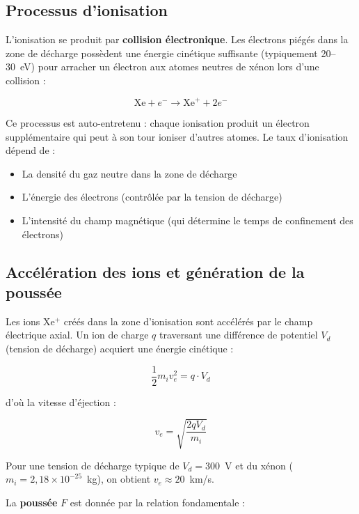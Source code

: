 \documentclass[12pt,a4paper]{article}
\begin{document}
\subsection{Processus d'ionisation}

L'ionisation se produit par \textbf{collision électronique}. Les électrons piégés dans la zone de décharge possèdent une énergie cinétique suffisante (typiquement 20--30~eV) pour arracher un électron aux atomes neutres de xénon lors d'une collision :

\begin{equation}
\text{Xe} + e^- \longrightarrow \text{Xe}^+ + 2e^-
\end{equation}

Ce processus est auto-entretenu : chaque ionisation produit un électron supplémentaire qui peut à son tour ioniser d'autres atomes. Le taux d'ionisation dépend de :
\begin{itemize}
    \item La densité du gaz neutre dans la zone de décharge
    \item L'énergie des électrons (contrôlée par la tension de décharge)
    \item L'intensité du champ magnétique (qui détermine le temps de confinement des électrons)
\end{itemize}

\subsection{Accélération des ions et génération de la poussée}

Les ions Xe$^+$ créés dans la zone d'ionisation sont accélérés par le champ électrique axial. Un ion de charge $q$ traversant une différence de potentiel $V_d$ (tension de décharge) acquiert une énergie cinétique :

\begin{equation}
\frac{1}{2} m_i v_e^2 = q \cdot V_d
\end{equation}

d'où la vitesse d'éjection :

\begin{equation}
v_e = \sqrt{\frac{2 q V_d}{m_i}}
\end{equation}

Pour une tension de décharge typique de $V_d = 300$~V et du xénon ($m_i = 2{,}18 \times 10^{-25}$~kg), on obtient $v_e \approx 20$~km/s.

La \textbf{poussée} $F$ est donnée par la relation fondamentale :
\end{document}

